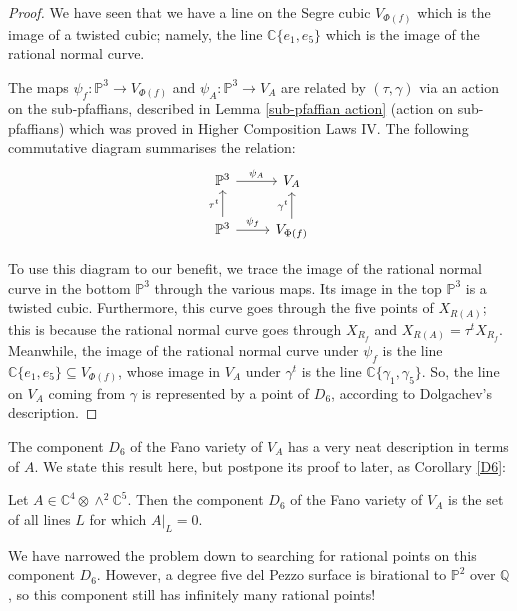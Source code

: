 \documentclass{report}
\begin{document}
\begin{proof}
We have seen that we have a line on the Segre cubic $V_{\Phi(f)}$ which is the image of a twisted cubic; namely, the line $\mathbb{C}\{e_1, e_5\}$ which is the image of the rational normal curve.

The maps $\psi_f : \mathbb{P}^3 \to V_{\Phi(f)}$ and $\psi_A : \mathbb{P}^3 \to V_A$ are related by $(\tau,\gamma)$ via an action on the sub-pfaffians, described in Lemma \ref{sub-pfaffian action} (action on sub-pfaffians) which was proved in Higher Composition Laws IV.  The following commutative diagram summarises the relation:
\begin{equation}
\begin{tikzcd}
\mathbb{P}^3 \arrow[r, "\psi_A"] & V_A \\
\mathbb{P}^3 \arrow[r, "\psi_f"] \arrow[u, "\tau^t"] & V_{\Phi(f)} \arrow[u, "\gamma^t"]
\end{tikzcd}
\end{equation}

To use this diagram to our benefit, we trace the image of the rational normal curve in the bottom $\mathbb{P}^3$ through the various maps.  Its image in the top $\mathbb{P}^3$ is a twisted cubic.  Furthermore, this curve goes through the five points of $X_{R(A)}$; this is because the rational normal curve goes through $X_{R_f}$ and $X_{R(A)} = \tau^t X_{R_f}$.  Meanwhile, the image of the rational normal curve under $\psi_f$ is the line $\mathbb{C}\{e_1, e_5\} \subseteq V_{\Phi(f)}$, whose image in $V_A$ under $\gamma^t$ is the line $\mathbb{C}\{\gamma_1,\gamma_5\}$.  So, the line on $V_A$ coming from $\gamma$ is represented by a point of $D_6$, according to Dolgachev's description.
\end{proof}

The component $D_6$ of the Fano variety of $V_A$ has a very neat description in terms of $A$.  We state this result here, but postpone its proof to later, as Corollary \ref{D6}:
\begin{prop}
Let $A \in \mathbb{C}^4 \otimes \wedge^2 \mathbb{C}^5$.  Then the component $D_6$ of the Fano variety of $V_A$ is the set of all lines $L$ for which $A|_L = 0$.
\end{prop}

We have narrowed the problem down to searching for rational points on this component $D_6$.  However, a degree five del Pezzo surface is birational to $\mathbb{P}^2$ over $\mathbb{Q}$, so this component still has infinitely many rational points!
\end{document}
